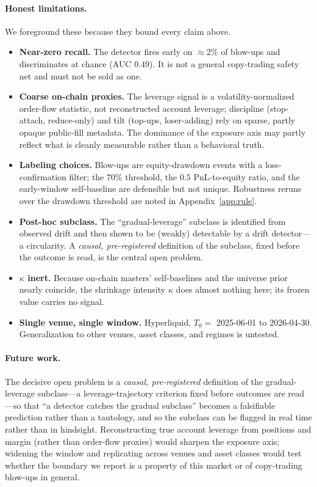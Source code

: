 \documentclass[11pt,a4paper]{article}
\newcommand{\Tnull}{T_{0}}
\begin{document}
\paragraph{Honest limitations.}
We foreground these because they bound every claim above.
\begin{itemize}[leftmargin=1.4em,itemsep=2pt]
  \item \textbf{Near-zero recall.} The detector fires early on $\approx$2\% of
        blow-ups and discriminates at chance (AUC $0.49$). It is not a general
        copy-trading safety net and must not be sold as one.
  \item \textbf{Coarse on-chain proxies.} The leverage signal is a
        volatility-normalized order-flow statistic, not reconstructed account
        leverage; discipline (stop-attach, reduce-only) and tilt (top-ups,
        loser-adding) rely on sparse, partly opaque public-fill metadata. The
        dominance of the exposure axis may partly reflect what is cleanly measurable
        rather than a behavioral truth.
  \item \textbf{Labeling choices.} Blow-ups are equity-drawdown events with a
        loss-confirmation filter; the $70\%$ threshold, the $0.5$ PnL-to-equity ratio,
        and the early-window self-baseline are defensible but not unique. Robustness
        reruns over the drawdown threshold are noted in Appendix~\ref{app:rule}.
  \item \textbf{Post-hoc subclass.} The ``gradual-leverage'' subclass is identified
        from observed drift and then shown to be (weakly) detectable by a drift
        detector---a circularity. A \emph{causal, pre-registered} definition of the
        subclass, fixed before the outcome is read, is the central open problem.
  \item \textbf{$\kappa$ inert.} Because on-chain masters' self-baselines and the
        universe prior nearly coincide, the shrinkage intensity $\kappa$ does almost
        nothing here; its frozen value carries no signal.
  \item \textbf{Single venue, single window.} Hyperliquid, $\Tnull = $ 2025-06-01 to
        2026-04-30. Generalization to other venues, asset classes, and regimes is
        untested.
\end{itemize}

\paragraph{Future work.}
The decisive open problem is a \emph{causal, pre-registered} definition of the
gradual-leverage subclass---a leverage-trajectory criterion fixed before outcomes
are read---so that ``a detector catches the gradual subclass'' becomes a falsifiable
prediction rather than a tautology, and so the subclass can be flagged in real time
rather than in hindsight. Reconstructing true account leverage from positions and
margin (rather than order-flow proxies) would sharpen the exposure axis; widening the
window and replicating across venues and asset classes would test whether the
boundary we report is a property of this market or of copy-trading blow-ups in
general.
\end{document}
